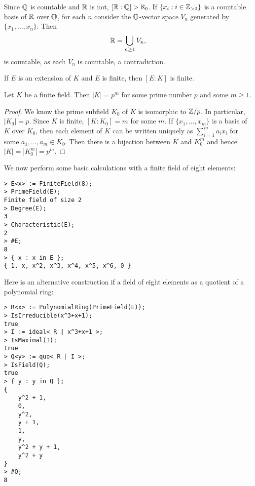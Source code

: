 \begin{example}
	Since $\mathbb{Q}$ is countable and 
	$\mathbb{R}$ is not, $[\mathbb{R}:\mathbb{Q}]>\aleph_0$. If $\{x_i:i\in\mathbb{Z}_{>0}\}$ 
	is a countable basis of $\mathbb{R}$ over $\mathbb{Q}$, for each
	$n$ consider the $\mathbb{Q}$-vector space
	$V_n$ generated by $\{x_1,\dots,x_n\}$. Then 
	\[
		\mathbb{R}=\bigcup_{n\geq1}V_n,
	\]
	is countable, as each $V_n$ is countable, a contradiction.
\end{example}

If $E$ is an extension of $K$ and $E$ is finite,
then $[E:K]$ is finite. 

\begin{proposition}
	Let $K$ be a finite field. Then $|K|=p^m$ 
	for some prime number $p$ and some $m\geq1$. 
\end{proposition}

\begin{proof}
	We know the prime subfield $K_0$ of $K$ is isomorphic to $\mathbb{Z}/p$. 
	In particular, $|K_0|=p$. Since $K$ is finite, 
	$[K:K_0]=m$ for some $m$. If $\{x_1,\dots,x_m\}$ is a basis
	of $K$ over $K_0$, then each element
	of $K$ can be written uniquely as
	$\sum_{i=1}^ma_ix_i$ for some $a_1,\dots,a_m\in K_0$. Then
	there is a bijection between $K$ and $K_0^m$ and hence $|K|=|K_0^m|=p^m$. 
\end{proof}

We now perform some basic calculations 
with a finite field of eight elements: 
\begin{lstlisting}
> E<x> := FiniteField(8);
> PrimeField(E);
Finite field of size 2
> Degree(E);
3
> Characteristic(E);
2
> #E;
8
> { x : x in E };
{ 1, x, x^2, x^3, x^4, x^5, x^6, 0 }
\end{lstlisting}

Here is an alternative construction if a field of eight elements
as a quotient of a polynomial ring:
\begin{lstlisting}
> R<x> := PolynomialRing(PrimeField(E));
> IsIrreducible(x^3+x+1);
true
> I := ideal< R | x^3+x+1 >;
> IsMaximal(I);
true
> Q<y> := quo< R | I >;
> IsField(Q);
true
> { y : y in Q };
{
    y^2 + 1,
    0,
    y^2,
    y + 1,
    1,
    y,
    y^2 + y + 1,
    y^2 + y
}
> #Q;
8    
\end{lstlisting}



